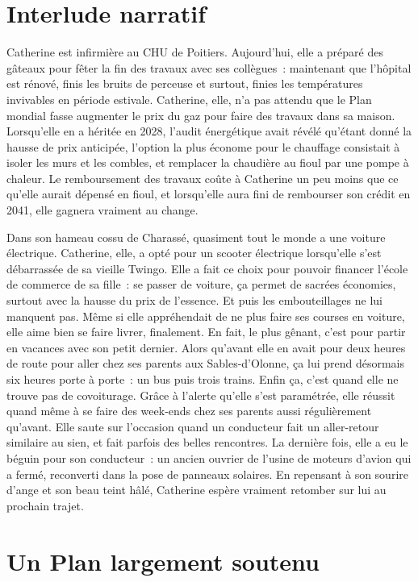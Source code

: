 \documentclass[a5paper,french,openany]{memoir}
\begin{document}
\chapter{Interlude narratif}

Catherine est infirmière au CHU de Poitiers. Aujourd'hui, elle a préparé des gâteaux pour fêter la fin des travaux avec ses collègues~: maintenant que l'hôpital est rénové, finis les bruits de perceuse et surtout, finies les températures invivables en période estivale. Catherine, elle, n'a pas attendu que le Plan mondial fasse augmenter le prix du gaz %
pour faire des travaux dans sa maison. Lorsqu'elle en a héritée en 2028, l'audit énergétique avait révélé qu'étant donné la hausse de prix anticipée, l'option la plus économe pour le chauffage consistait à isoler les murs et les combles, et remplacer la chaudière au fioul par une pompe à chaleur. Le remboursement des travaux coûte à Catherine un peu moins que ce qu'elle aurait dépensé en fioul, et lorsqu'elle aura fini de rembourser son crédit en 2041, elle gagnera vraiment au change. 

Dans son hameau cossu de Charassé, quasiment tout le monde a une voiture électrique. Catherine, elle, a opté pour un scooter électrique lorsqu'elle s'est débarrassée de sa vieille Twingo. Elle a fait ce choix pour pouvoir financer l'école de commerce de sa fille~: se passer de voiture, ça permet de sacrées économies, surtout avec la hausse du prix de l'essence. Et puis les embouteillages ne lui manquent pas. Même si elle appréhendait de ne plus faire ses courses en voiture, elle aime bien se faire livrer, finalement. En fait, le plus gênant, c'est pour partir en vacances avec son petit dernier. Alors qu'avant elle en avait pour deux heures de route pour aller chez ses parents aux Sables-d'Olonne, ça lui prend désormais six heures porte à porte~: un bus puis trois trains. Enfin ça, c'est quand elle ne trouve pas de covoiturage. Grâce à l'alerte qu'elle s'est paramétrée, elle réussit quand même à se faire des week-ends chez ses parents aussi régulièrement qu'avant. Elle saute sur l'occasion quand un conducteur fait un aller-retour similaire au sien, et fait parfois des belles rencontres. La dernière fois, elle a eu le béguin pour son conducteur~: un ancien ouvrier de l'usine de moteurs d'avion qui a fermé, reconverti dans la pose de panneaux solaires. En repensant à son sourire d'ange et son beau teint hâlé, Catherine espère vraiment retomber sur lui au prochain trajet.


\chapter{Un Plan largement soutenu\label{ch:soutien}}
\end{document}
